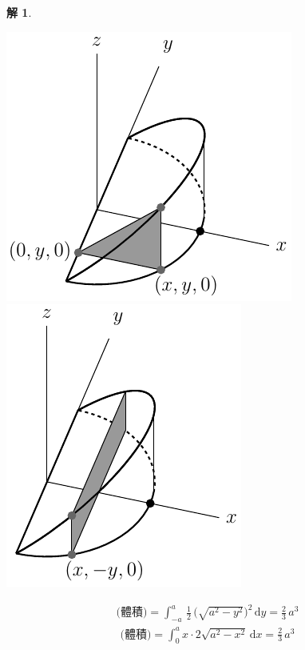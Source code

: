 \documentclass[12pt]{extarticle}
\theoremstyle{definition}
\newtheorem*{sol}{解}
\begin{document}
\begin{sol}
  \vspace{3mm}
  \begin{minipage}{0.55\textwidth}
    \begin{center}
      \includegraphics[scale=0.8,page=1]{notch3a}\quad\includegraphics[scale=0.8,page=1]{notch2a}
    \end{center}
  \end{minipage}
  \begin{minipage}{0.4\textwidth}
    \begin{align*}
      \text{(體積)} = \int_{-a}^a\,\frac{1}{2}\,\big(\sqrt{a^2 - y^2}\big)^2\,\text{d}y = \frac{2}{3}\,a^3
    \end{align*}
    \begin{align*}
      \text{(體積)} = \int_0^a x\cdot 2\sqrt{a^2-x^2}\,\text{d}x = \frac{2}{3}\,a^3
    \end{align*}
  \end{minipage}
\end{sol}
\end{document}
